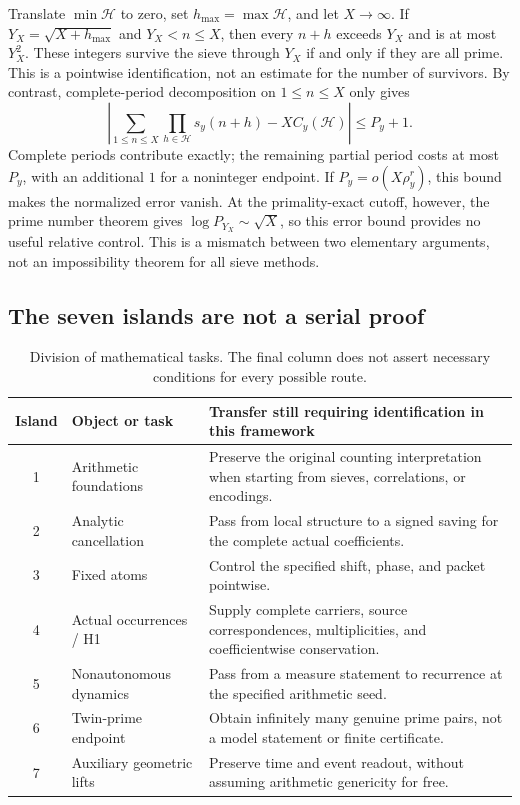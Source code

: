 Translate $\min\mathcal H$ to zero, set $h_{\max}=\max\mathcal H$, and let $X\to\infty$. If $Y_X=\sqrt{X+h_{\max}}$ and $Y_X<n\le X$, then every $n+h$ exceeds $Y_X$ and is at most $Y_X^2$. These integers survive the sieve through $Y_X$ if and only if they are all prime. This is a pointwise identification, not an estimate for the number of survivors. By contrast, complete-period decomposition on $1\le n\le X$ only gives
\[
\left|\sum_{1\le n\le X}\prod_{h\in\mathcal H}s_y(n+h)-XC_y(\mathcal H)\right|\le P_y+1.
\]
Complete periods contribute exactly; the remaining partial period costs at most $P_y$, with an additional $1$ for a noninteger endpoint. If $P_y=o(X\rho_y^r)$, this bound makes the normalized error vanish. At the primality-exact cutoff, however, the prime number theorem gives $\log P_{Y_X}\sim\sqrt X$, so this error bound provides no useful relative control. This is a mismatch between two elementary arguments, not an impossibility theorem for all sieve methods.

\subsection{The seven islands are not a serial proof}
\begin{table}[ht]
\centering\small
\caption{Division of mathematical tasks. The final column does not assert necessary conditions for every possible route.}
\begin{tabularx}{\textwidth}{c p{} X}
\toprule
Island & Object or task & Transfer still requiring identification in this framework\\\midrule
1 & Arithmetic foundations & Preserve the original counting interpretation when starting from sieves, correlations, or encodings.\\
2 & Analytic cancellation & Pass from local structure to a signed saving for the complete actual coefficients.\\
3 & Fixed atoms & Control the specified shift, phase, and packet pointwise.\\
4 & Actual occurrences / H1 & Supply complete carriers, source correspondences, multiplicities, and coefficientwise conservation.\\
5 & Nonautonomous dynamics & Pass from a measure statement to recurrence at the specified arithmetic seed.\\
6 & Twin-prime endpoint & Obtain infinitely many genuine prime pairs, not a model statement or finite certificate.\\
7 & Auxiliary geometric lifts & Preserve time and event readout, without assuming arithmetic genericity for free.\\
\bottomrule
\end{tabularx}
\end{table}

